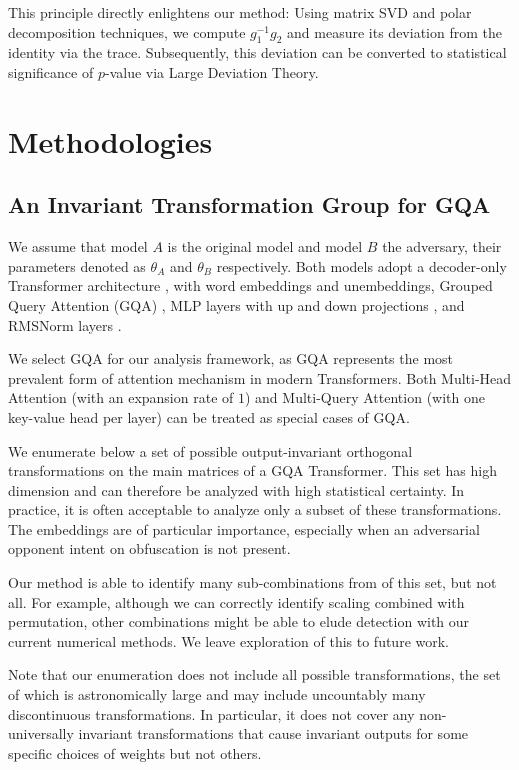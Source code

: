 \documentclass{article} %
\begin{document}
This principle directly enlightens our method: Using matrix SVD and polar decomposition techniques, we compute $g_1^{-1} g_2$ and measure its deviation from the identity via the trace.
Subsequently, this deviation can be converted to statistical significance of $p$-value via Large Deviation Theory.

\section{Methodologies}
\subsection{An Invariant Transformation Group for GQA}
\label{invar_gqa}
We assume that model $A$ is the original model and model $B$ the adversary, their parameters denoted as $\theta_A$ and $\theta_B$ respectively. 
Both models adopt a decoder-only Transformer architecture \citep{vaswani2017attention,radford2019language},  
with word embeddings and unembeddings, Grouped Query Attention (GQA) \citep{ainslie2023gqatraininggeneralizedmultiquery},  
MLP layers with up and down projections \citep{shazeer2020gluvariantsimprovetransformer}, and RMSNorm layers \citep{zhang2019rootmeansquarelayer}.  

We select GQA for our analysis framework, as GQA represents the most prevalent form of attention mechanism  
in modern Transformers. Both Multi-Head Attention (with an expansion rate of $1$) \citep{vaswani2017attention}  
and Multi-Query Attention (with one key-value head per layer) \citep{shazeer2019fasttransformerdecodingwritehead}  
can be treated as special cases of GQA.

We enumerate below a set of possible output-invariant orthogonal transformations on the main matrices of a GQA Transformer. This set has high dimension and can therefore be analyzed with high statistical certainty. In practice, it is often acceptable to analyze only a subset of these transformations. The embeddings are of particular importance, especially when an adversarial opponent intent on obfuscation is not present. 

Our method is able to identify many sub-combinations from of this set, but not all. For example, although we can correctly identify scaling combined with permutation, other combinations might be able to elude detection with our current numerical methods. We leave exploration of this to future work.

Note that our enumeration does not include all possible transformations, the set of which is astronomically large and may include uncountably many discontinuous transformations.  In particular, it does not cover any non-universally invariant transformations that cause invariant outputs for some specific choices of weights but not others. 
\end{document}
